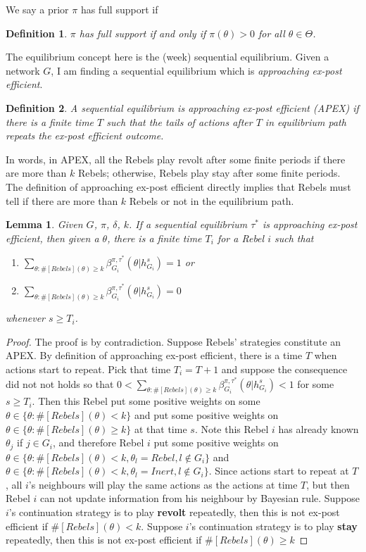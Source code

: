 \documentclass[12pt,letter]{article}
\newtheorem{lemma}{Lemma}[section]
\newtheorem{definition}{Definition}[section]
\theoremstyle{definition}
\theoremstyle{remark}
\theoremstyle{claim}
\begin{document}
We say a prior $\pi$ has full support if  
\begin{definition}
$\pi$ has full support if and only if $\pi(\theta)>0$ for all $\theta\in \Theta$.
\end{definition}

The equilibrium concept here is the (week) sequential equilibrium. Given a network $G$, I am finding a sequential equilibrium which is \textit{approaching ex-post efficient}. 

\begin{definition}\label{Def_expost_efficient}
A sequential equilibrium is approaching ex-post efficient (APEX) if there is a finite time $T$ such that the tails of actions after $T$ in equilibrium path repeats the ex-post efficient outcome.
\end{definition}

In words, in APEX, all the Rebels play revolt after some finite periods if there are more than $k$ Rebels; otherwise, Rebels play stay after some finite periods. The definition of approaching ex-post efficient directly implies that Rebels must tell if there are more than $k$ Rebels or not in the equilibrium path.

\begin{lemma}\label{lemma_learn}
Given $G$, $\pi$, $\delta$, $k$. If a sequential equilibrium $\tau^*$ is approaching ex-post efficient, then given a $\theta$, there is a finite time $T_i$ for a Rebel $i$ such that
\begin{enumerate}
\item $\sum_{\theta:\#[Rebels](\theta)\geq k}\beta^{\pi,\tau^*}_{G_i}(\theta|h^{s}_{G_i})=1$  or
\item $\sum_{\theta:\#[Rebels](\theta)\geq k}\beta^{\pi,\tau^*}_{G_i}(\theta|h^{s}_{G_i})=0$ 
\end{enumerate}
whenever $s\geq T_i$.
\end{lemma}
\begin{proof}
The proof is by contradiction. Suppose Rebels' strategies constitute an APEX. By definition of approaching ex-post efficient, there is a time $T$ when actions start to repeat. Pick that time $T_i=T+1$ and suppose the consequence did not not holds so that $0<\sum_{\theta:\#[Rebels](\theta)\geq k}\beta^{\pi,\tau^*}_{G_i}(\theta|h^{s}_{G_i})<1$ for some $s\geq T_i$. Then this Rebel put some positive weights on some $\theta\in \{\theta:\#[Rebels](\theta)< k\}$ and put some positive weights on $\theta\in \{\theta:\#[Rebels](\theta)\geq k\}$ at that time $s$. Note this Rebel $i$ has already known $\theta_j$ if $j\in G_i$, and therefore Rebel $i$ put some positive weights on $\theta\in \{\theta:\#[Rebels](\theta)< k, \theta_l=Rebel, l\notin G_i\}$ and $\theta\in \{\theta:\#[Rebels](\theta)< k, \theta_l=Inert, l\notin G_i\}$. Since actions start to repeat at $T$, all $i$'s neighbours will play the same actions as the actions at time $T$, but then Rebel $i$ can not update information from his neighbour by Bayesian rule. Suppose $i$'s continuation strategy is to play \textbf{revolt} repeatedly, then this is not ex-post efficient if $\#[Rebels](\theta)< k$. Suppose $i$'s continuation strategy is to play \textbf{stay} repeatedly, then this is not ex-post efficient if $\#[Rebels](\theta)\geq k$
\end{proof}
\end{document}
